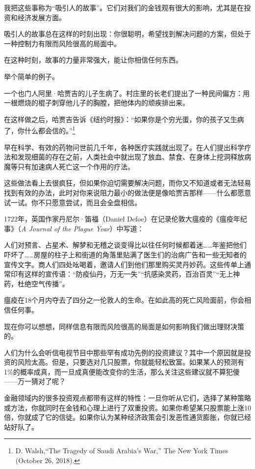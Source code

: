 我把这些事称为“吸引人的故事”。它们对我们的金钱观有很大的影响，尤其是在投资和经济发展方面。

吸引人的故事总在这样的时刻出现：你很聪明，希望找到解决问题的方案，但处于一种控制力有限而风险很高的局面中。

在这种时刻，故事的力量非常强大，能让你相信任何东西。

举个简单的例子。

一个也门人阿里·哈贾吉的儿子生病了。村庄里的长老们提出了一种民间偏方：用一根燃烧的棍子刺穿他儿子的胸膛，把他体内的顽疾排出来。

在这样做之后，哈贾吉告诉《纽约时报》：“如果你是个穷光蛋，你的孩子又生病了，你什么都会信的。”\footnote{D. Walsh,“The Tragedy of Saudi Arabia’s War,” The New York Times (October 26, 2018).}

早在科学、有效的药物问世前几千年，各种医疗实践就出现了。在人们提出科学疗法和发现细菌的存在之前，人类社会中就出现了放血、禁食、在身体上挖洞释放病魔等只有加速病人死亡这一个作用的疗法。

这些做法看上去很疯狂，但如果你迫切需要解决问题，而你又不知道或者无法轻易找到有效的办法，此时对你来说阻力最小的做法便是像哈贾吉那样——什么都愿意试一试。你不只愿意尝试，而且会全盘相信。

1722年，英国作家丹尼尔·笛福（Daniel Defoe）在记录伦敦大瘟疫的《瘟疫年纪事》（\textit{A Journal of the Plague Year}）中写道：

{\kaishu

人们对预言、占星术、解梦和无稽之谈变得比以往任何时候都着迷……年鉴把他们吓坏了……房屋的柱子上和街道的角落里贴满了医生们的治病广告和一些无知者的宣传文字。商人们四处吆喝着，邀请人们到他们那里购买灵丹妙药。这些传单上通常印有这样的宣传语：“防疫仙丹，万无一失”“抗感染灵药，百治百灵”“无上神药，杜绝空气传播”。

}

瘟疫在18个月内夺去了四分之一伦敦人的生命。在如此高的死亡风险面前，你会相信任何事。

现在你可以想想，同样信息有限而风险很高的局面是如何影响我们做出理财决策的。

人们为什么会听信电视节目中那些罕有成功先例的投资建议？其中一个原因就是投资的风险太高。但是，只要选对几只股票，你就能轻松致富。如果某人的预测有1\%的概率成真，而一旦成真便能改变你的生活，那么关注这些建议就不算犯傻——万一猜对了呢？

金融领域内的很多投资观点都带有这样的特性：一旦你听从它们，选择了某种策略或方法，你就同时在金钱和心理上进行了双重投资。如果你希望某只股票能上涨10倍，你就成了它的信徒。如果你认为某种经济政策会引发恶性通货膨胀，你就已经站好队了。

